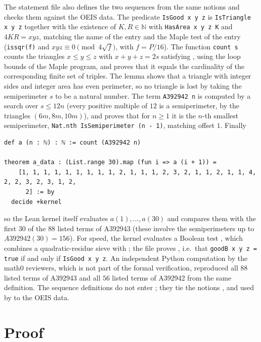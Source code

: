 \documentclass[11pt]{amsart}
\theoremstyle{plain}
\theoremstyle{definition}
\newcommand{\N}{\mathbb{N}}
\begin{document}
The statement file also defines the two sequences from the same notions and checks them against the OEIS data. The predicate \texttt{IsGood x y z} is \texttt{IsTriangle x y z} together with the existence of $K,R\in\N$ with \texttt{HasArea x y z K} and $4KR=xyz$, matching the name of the entry and the Maple test of the entry (\texttt{issqr(f)} and $xyz\equiv0\pmod{4\sqrt f}$, with $f=P/16$). The function \texttt{count s} counts the triangles $x\le y\le z$ with $x+y+z=2s$ satisfying , using the loop bounds of the Maple program, and  proves that it equals the cardinality of the corresponding finite set of triples. The lemma  shows that a triangle with integer sides and integer area has even perimeter, so no triangle is lost by taking the semiperimeter $s$ to be a natural number. The term \texttt{A392942 n} is computed by a search over $s\le 12n$ (every positive multiple of $12$ is a semiperimeter, by the triangles $(6m,8m,10m)$), and  proves that for $n\ge1$ it is the $n$-th smallest semiperimeter, \texttt{Nat.nth IsSemiperimeter (n - 1)}, matching offset $1$. Finally
\begin{lstlisting}
def a (n : ℕ) : ℕ := count (A392942 n)

theorem a_data : (List.range 30).map (fun i => a (i + 1)) =
    [1, 1, 1, 1, 1, 1, 1, 1, 1, 2, 1, 1, 1, 2, 3, 2, 1, 1, 2, 1, 1, 4, 2, 2, 3, 2, 3, 1, 2,
      2] := by
  decide +kernel
\end{lstlisting}
so the Lean kernel itself evaluates $a(1),\dots,a(30)$ and compares them with the first $30$ of the $88$ listed terms of A392943 (these involve the semiperimeters up to $A392942(30)=156$). For speed, the kernel evaluates a Boolean test , which combines a quadratic-residue sieve with ; the file proves , i.e.\ that \texttt{goodB x y z = true} if and only if \texttt{IsGood x y z}. An independent Python computation by the math0 reviewers, which is not part of the formal verification, reproduced all $88$ listed terms of A392943 and all $56$ listed terms of A392942 from the same definition. The sequence definitions do not enter ; they tie the notions ,  and  used by  to the OEIS data.

\section{Proof}\label{sec:proof}
\end{document}
